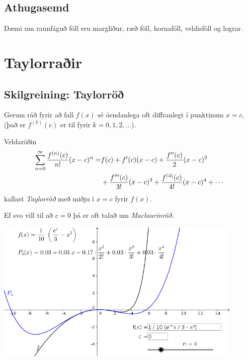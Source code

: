 \documentclass[b5paper,10pt,icelandic]{sphinxmanual}
\begin{document}
\subsection{Athugasemd}
\label{kafli10:athugasemd}
Dæmi um raunfáguð föll eru margliður, ræð föll, hornaföll, veldisföll og
lograr.


\section{Taylorraðir}
\label{kafli10:taylorrair}\label{kafli10:index-6}

\subsection{Skilgreining: Taylorröð}
\label{kafli10:skilgreining-taylorro}
Gerum ráð fyrir að fall \(f(x)\) sé óendanlega oft diffranlegt í
punktinum \(x=c\), (það er \(f^{(k)}(c)\) er til fyrir
\(k=0, 1, 2, \ldots\)).

Veldaröðin
\begin{gather}
\begin{split}\begin{aligned}
\sum_{n=0}^\infty \frac{f^{(n)}(c)}{n!}(x-c)^n = & f(c)+f'(c)(x-c)+
\frac{f''(c)}{2}(x-c)^2 \\ & + \frac{f'''(c)}{3!}(x-c)^3
+ \frac{f^{(4)}(c)}{4!}(x-c)^4 + \cdots \end{aligned}\end{split}\notag
\end{gather}
kallast \emph{Taylorröð} með miðju í \(x=c\) fyrir \(f(x)\).

Ef svo vill til að \(c=0\) þá er oft talað um \emph{Maclaurinröð}.


\begin{center}
\includegraphics[width=12cm,keepaspectratio=true]{03_Taylorrod.png}
\end{center}
\end{document}
